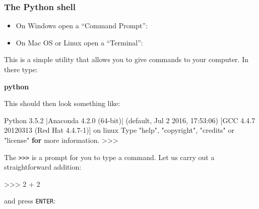 \documentclass[11pt]{article}
\newenvironment{Shaded}{}{}
\newcommand{\KeywordTok}[1]{\textcolor[rgb]{0.00,0.44,0.13}{\textbf{{#1}}}}
\newcommand{\DecValTok}[1]{\textcolor[rgb]{0.25,0.63,0.44}{{#1}}}
\newcommand{\FloatTok}[1]{\textcolor[rgb]{0.25,0.63,0.44}{{#1}}}
\newcommand{\StringTok}[1]{\textcolor[rgb]{0.25,0.44,0.63}{{#1}}}
\newcommand{\NormalTok}[1]{{#1}}
\newcommand{\ControlFlowTok}[1]{\textcolor[rgb]{0.00,0.44,0.13}{\textbf{{#1}}}}
\newcommand{\OperatorTok}[1]{\textcolor[rgb]{0.40,0.40,0.40}{{#1}}}
\begin{document}
\subsubsection{The Python shell}\label{the-python-shell}

\begin{itemize}
\item
  On Windows open a ``Command Prompt'':
\item
  On Mac OS or Linux open a ``Terminal'':
\end{itemize}

This is a simple utility that allows you to give commands to your
computer. In there type:

\begin{Shaded}
\begin{Highlighting}[]
\KeywordTok{python}
\end{Highlighting}
\end{Shaded}

This should then look something like:

\begin{Shaded}
\begin{Highlighting}[]
\NormalTok{Python }\FloatTok{3.5.2} \OperatorTok{|}\NormalTok{Anaconda }\FloatTok{4.2.0} \NormalTok{(}\DecValTok{64}\OperatorTok{-}\NormalTok{bit)}\OperatorTok{|} \NormalTok{(default, Jul  }\DecValTok{2} \DecValTok{2016}\NormalTok{, }\DecValTok{17}\NormalTok{:}\DecValTok{53}\NormalTok{:}\DecValTok{06}\NormalTok{) }
\NormalTok{[GCC }\FloatTok{4.4.7} \DecValTok{20120313} \NormalTok{(Red Hat }\FloatTok{4.4.7}\DecValTok{-1}\NormalTok{)] on linux}
\NormalTok{Type }\StringTok{"help"}\NormalTok{, }\StringTok{"copyright"}\NormalTok{, }\StringTok{"credits"} \OperatorTok{or} \StringTok{"license"} \ControlFlowTok{for} \NormalTok{more information.}
\OperatorTok{>>>} 
\end{Highlighting}
\end{Shaded}

The \texttt{\textgreater{}\textgreater{}\textgreater{}} is a prompt for
you to type a command. Let us carry out a straightforward addition:

\begin{Shaded}
\begin{Highlighting}[]
\OperatorTok{>>>} \DecValTok{2} \OperatorTok{+} \DecValTok{2}
\end{Highlighting}
\end{Shaded}

and press \texttt{ENTER}:
\end{document}
